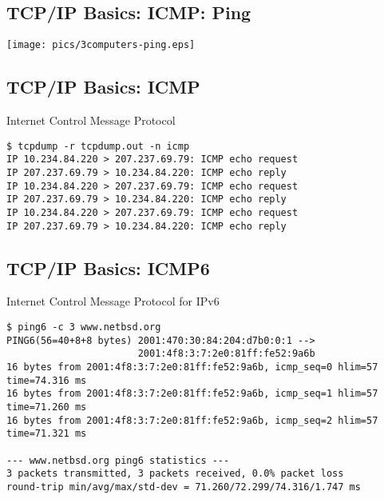 \documentclass[xga]{xdvislides}
\begin{document}
\subsection{TCP/IP Basics: ICMP: Ping}
\vspace*{\fill}
\begin{center}
	\texttt{[image: pics/3computers-ping.eps]}
\end{center}
\vspace*{\fill}


\subsection{TCP/IP Basics: ICMP}
\begin{center}
Internet Control Message Protocol
\end{center}
\vspace{.2in}

\begin{verbatim}
$ tcpdump -r tcpdump.out -n icmp
IP 10.234.84.220 > 207.237.69.79: ICMP echo request
IP 207.237.69.79 > 10.234.84.220: ICMP echo reply
IP 10.234.84.220 > 207.237.69.79: ICMP echo request
IP 207.237.69.79 > 10.234.84.220: ICMP echo reply
IP 10.234.84.220 > 207.237.69.79: ICMP echo request
IP 207.237.69.79 > 10.234.84.220: ICMP echo reply
\end{verbatim}


\subsection{TCP/IP Basics: ICMP6}
\begin{center}
Internet Control Message Protocol for IPv6
\end{center}
\vspace{.2in}

\begin{verbatim}
$ ping6 -c 3 www.netbsd.org
PING6(56=40+8+8 bytes) 2001:470:30:84:204:d7b0:0:1 -->
                       2001:4f8:3:7:2e0:81ff:fe52:9a6b
16 bytes from 2001:4f8:3:7:2e0:81ff:fe52:9a6b, icmp_seq=0 hlim=57 time=74.316 ms
16 bytes from 2001:4f8:3:7:2e0:81ff:fe52:9a6b, icmp_seq=1 hlim=57 time=71.260 ms
16 bytes from 2001:4f8:3:7:2e0:81ff:fe52:9a6b, icmp_seq=2 hlim=57 time=71.321 ms

--- www.netbsd.org ping6 statistics ---
3 packets transmitted, 3 packets received, 0.0% packet loss
round-trip min/avg/max/std-dev = 71.260/72.299/74.316/1.747 ms
\end{verbatim}
\end{document}
